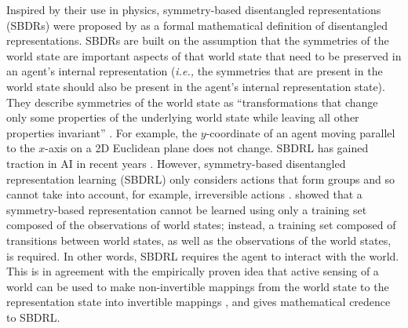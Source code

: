 Inspired by their use in physics, symmetry-based disentangled representations (SBDRs) were proposed by \autocite{Higgins2018} as a formal mathematical definition of disentangled representations.
SBDRs are built on the assumption that the symmetries of the world state are important aspects of that world state that need to be preserved in an agent's internal representation (\textit{i.e.,} the symmetries that are present in the world state should also be present in the agent's internal representation state).
They describe symmetries of the world state as ``transformations that change only some properties of the underlying world state while leaving all other properties invariant'' 
\cite[page 1]{Higgins2018}.
For example, the $y$-coordinate of an agent moving parallel to the $x$-axis on a 2D Euclidean plane does not change.
SBDRL has gained traction in AI in recent years \autocite{Park2022learning,Quessard2020learning,Miyato2022unsupervised,Wang2022surprising,Keurti2023homomorphism,Zhu2021commutative,Wang2021self,Pfau2020disentangling,caselles2019symmetry,Mercatali2022,Marchetti2023}.
However, symmetry-based disentangled representation learning (SBDRL) only considers actions that form groups and so cannot take into account, for example, irreversible actions \autocite{Higgins2018}.
\autocite{caselles2019symmetry} showed that a symmetry-based representation cannot be learned using only a training set composed of the observations of world states; instead, a training set composed of transitions between world states, as well as the observations of the world states, is required.
In other words, SBDRL requires the agent to interact with the world.
This is in agreement with the empirically proven idea that active sensing of a world can be used to make non-invertible mappings from the world state to the representation state into invertible mappings \autocite{soatto2011steps}, and gives mathematical credence to SBDRL.

